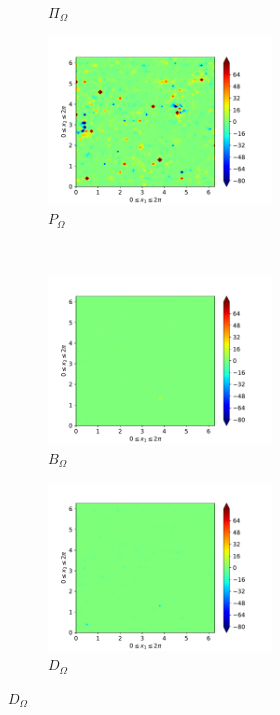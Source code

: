 \begin{figure}[H]
\begin{subfigure}{0.45\textwidth}
        \caption{$\Pi_{\Omega}$}
    \end{subfigure}
    \newline
    \begin{subfigure}{0.45\textwidth}
        \includegraphics[height=1.75in]{media/run-cds-65/P-enst-1440}
        \caption{$P_{\Omega}$}
    \end{subfigure}
    ~
    \begin{subfigure}{0.45\textwidth}
        \includegraphics[height=1.75in]{media/run-cds-65/B-enst-1440}
        \caption{$B_{\Omega}$}
    \end{subfigure}
    \newline
    \begin{subfigure}{0.45\textwidth}
        \includegraphics[height=1.75in]{media/run-cds-65/D-enst-1440}
        \caption{$D_{\Omega}$}
    \end{subfigure}
\end{figure}

\newpage

